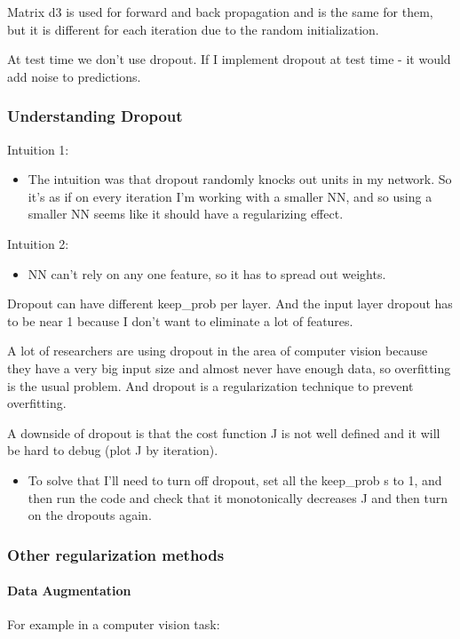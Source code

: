 Matrix d3 is used for forward and back propagation and is the same for them, but it is different for each iteration due to the random initialization.

At test time we don't use dropout. If I implement dropout at test time - it would add noise to predictions.

\subsubsection{Understanding Dropout}
Intuition 1:
\begin{itemize}
    \item The intuition was that dropout randomly knocks out units in my network. So it's as if on every iteration I'm working with a smaller NN, and so using a smaller NN seems like it should have a regularizing effect.
\end{itemize}

Intuition 2:
\begin{itemize}
    \item NN can't rely on any one feature, so it has to spread out weights.
\end{itemize}

Dropout can have different keep\_prob per layer. And the input layer dropout has to be near 1 because I don't want to eliminate a lot of features.

A lot of researchers are using dropout in the area of computer vision because they have a very big input size and almost never have enough data, so overfitting is the usual problem. And dropout is a regularization technique to prevent overfitting.

A downside of dropout is that the cost function J is not well defined and it will be hard to debug (plot J by iteration).
\begin{itemize}
    \item To solve that I'll need to turn off dropout, set all the keep\_prob s to 1, and then run the code and check that it monotonically decreases J and then turn on the dropouts again.
\end{itemize}

\subsubsection{Other regularization methods}
\paragraph{Data Augmentation}
For example in a computer vision task:

